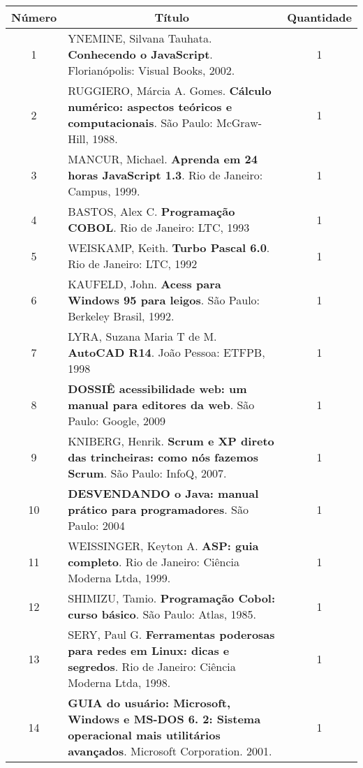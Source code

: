 \begin{longtable}{|c|p{115mm}|c|}
\hline
Número & \multicolumn{1}{c|}{Título}                                                           & Quantidade \\ \hline
1      & YNEMINE, Silvana Tauhata. \textbf{Conhecendo o JavaScript}. Florianópolis: Visual Books, 2002. & 1          \\ \hline
2      & RUGGIERO, Márcia A. Gomes. \textbf{Cálculo numérico: aspectos teóricos e computacionais}. São Paulo: McGraw-Hill, 1988. & 1          \\ \hline
3      & MANCUR, Michael. \textbf{Aprenda em 24 horas JavaScript 1.3}. Rio de Janeiro: Campus, 1999. & 1          \\ \hline
4      & BASTOS, Alex C. \textbf{Programação COBOL}. Rio de Janeiro: LTC, 1993                 		 & 1          \\ \hline
5      & WEISKAMP, Keith. \textbf{Turbo Pascal 6.0}. Rio de Janeiro: LTC, 1992                 		 & 1          \\ \hline
6      & KAUFELD, John. \textbf{Acess para Windows 95 para leigos}. São Paulo: Berkeley Brasil, 1992.& 1          \\ \hline
7      & LYRA, Suzana Maria T de M. \textbf{AutoCAD R14}. João Pessoa: ETFPB, 1998                      & 1          \\ \hline
8      & \textbf{DOSSIÊ acessibilidade web: um manual para editores da web}. São Paulo: Google, 2009 & 1          \\ \hline
9      & KNIBERG, Henrik. \textbf{Scrum e XP direto das trincheiras: como nós fazemos Scrum}. São Paulo: InfoQ, 2007. & 1          \\ \hline
10     & \textbf{DESVENDANDO o Java: manual prático para programadores}. São Paulo: 2004       & 1          \\ \hline
11     & WEISSINGER, Keyton A. \textbf{ASP: guia completo}. Rio de Janeiro: Ciência Moderna Ltda, 1999. & 1          \\ \hline
12     & SHIMIZU, Tamio. \textbf{Programação Cobol: curso básico}. São Paulo: Atlas, 1985.     & 1          \\ \hline
13     & SERY, Paul G. \textbf{Ferramentas poderosas para redes em Linux: dicas e segredos}. Rio de Janeiro: Ciência Moderna Ltda, 1998. & 1          \\ \hline
14     & \textbf{GUIA do usuário: Microsoft, Windows e MS-DOS 6. 2: Sistema operacional mais utilitários avançados}. Microsoft Corporation. 2001. & 1          \\ \hline

\end{longtable}
